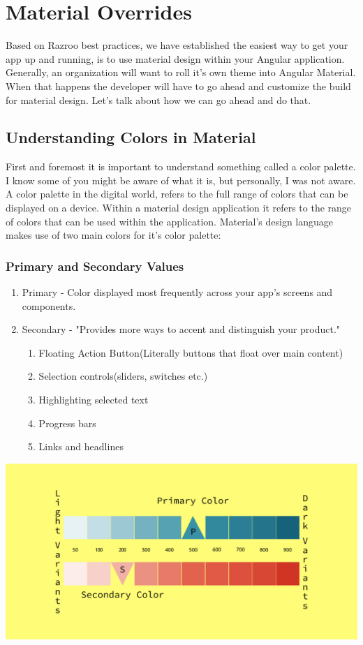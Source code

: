 
\chapter{ Material Overrides }

Based on Razroo best practices, we have established the easiest way to get 
your app up and running, is to use material design within your Angular 
application. Generally, an organization will want to roll it's own theme into 
Angular Material. When that happens the developer will have to go ahead and 
customize the build for material design. Let's talk about how we can go ahead 
and do that. 

\section{Understanding Colors in Material}
First and foremost it is important to understand something called a color 
palette. I know some of you might be aware of what it is, but personally, I was
not aware. A color palette in the digital world, refers to the full range of 
colors that can be displayed on a device. Within a material design application 
it refers to the range of colors that can be used within the application. 
Material's design language makes use of two main colors for it's color palette: 

\subsection{Primary and Secondary Values}
\begin{enumerate}
  \item Primary - Color displayed most frequently across your app's screens and
  components. 
  \item Secondary - "Provides more ways to accent and distinguish your product."
  \begin{enumerate}
    \item Floating Action Button(Literally buttons that float over main content)
    \item Selection controls(sliders, switches etc.)
    \item Highlighting selected text
    \item Progress bars
    \item Links and headlines
  \end{enumerate}
\end{enumerate}

\includegraphics[width=414pt]{design-language-system/material-overrides/material-design-palette_pt.pdf}


